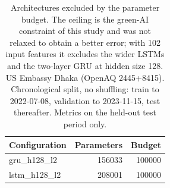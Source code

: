 \begin{table}[htbp]
\caption{Architectures excluded by the parameter budget. The ceiling is the green-AI constraint of this study and was not relaxed to obtain a better error; with 102 input features it excludes the wider LSTMs and the two-layer GRU at hidden size 128. US Embassy Dhaka (OpenAQ 2445+8415). Chronological split, no shuffling: train to 2022-07-08, validation to 2023-11-15, test thereafter. Metrics on the held-out test period only.}
\label{tab:green_excluded_configs}
\begin{tabular}{lrr}
\toprule
Configuration & Parameters & Budget \\
\midrule
gru\_h128\_l2 & 156033 & 100000 \\
lstm\_h128\_l2 & 208001 & 100000 \\
\bottomrule
\end{tabular}
\end{table}

